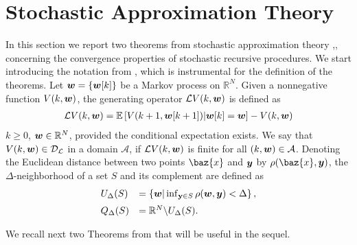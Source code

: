 \documentclass[10pt,twocolumn]{IEEEtran}
\def\bw{\mbox{\boldmath $w$}}
\def\bx{\baz{x}}
\def\by{\mbox{\boldmath $y$}}
\begin{document}
\appendices



\section{Stochastic Approximation Theory}

In this section we report two theorems from stochastic approximation theory \cite{Nevel},\cite{Kar-Moura}, concerning the convergence properties of stochastic recursive procedures. We start introducing the notation from \cite{Nevel}, which is instrumental for the definition of the theorems. Let $\bw=\{\bw[k]\}$ be a Markov process on $\mathbb{R}^{N}$. Given  a nonnegative function
$V(k,\bw)$, the generating operator $\mathcal{L}V(k,\bw)$ is defined as
\begin{eqnarray}\label{Gen_operator}
\mathcal{L}V(k,\bw)=\mathbb{E}\left[ V(k+1,\bw[k+1]) | \bw[k]=\bw \right]-V(k,\bw)
\end{eqnarray}
$k\geq 0$, $\bw\in \mathbb{R}^{N}$, provided the conditional expectation exists. We say that $V(k,\bw)\in\mathcal{D}_\mathcal{L}$ in a domain $\mathcal{A}$, if $\mathcal{L}V(k,\bw)$ is finite for all $(k,\bw)\in \mathcal{A}$. Denoting the Euclidean distance between two points $\bx$ and $\by$ by $\rho(\bx,\by)$, the $\Delta$-neighborhood of a set $S$ and its complement are defined as
\begin{align}
  \begin{array}{ll}
    U_\Delta(S)&=\left\{\bw|\inf_{\mathbf{y}\in S} \rho(\bw,\by)<\Delta\right\},\vspace{.2cm} \\
    Q_\Delta(S)&=\mathbb{R}^{N} \backslash  U_\Delta(S).
  \end{array}
\label{neigh1}
\end{align}

We recall next two Theorems from \cite{Nevel} that will be useful in the sequel.
\end{document}
